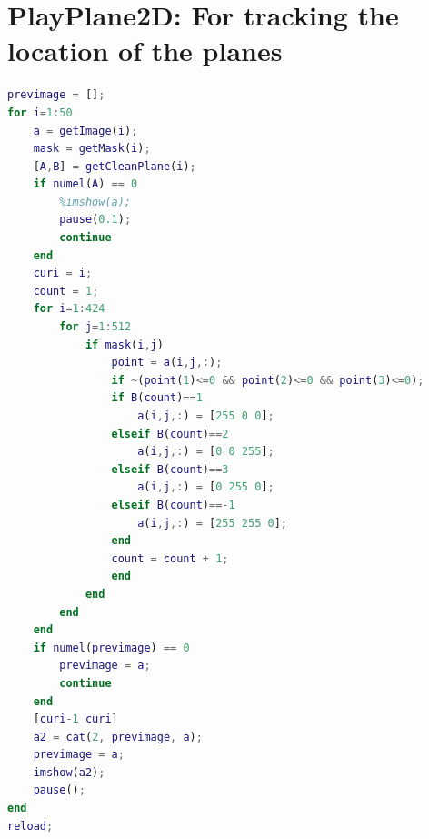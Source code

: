 \documentclass[10pt,a4paper]{article}
\begin{document}
\section{PlayPlane2D: For tracking the location of the planes}
\begin{lstlisting}[language=matlab]
previmage = [];
for i=1:50
    a = getImage(i);
    mask = getMask(i);
    [A,B] = getCleanPlane(i);
    if numel(A) == 0
        %imshow(a);
        pause(0.1);
        continue
    end
    curi = i;
    count = 1;
    for i=1:424
        for j=1:512
            if mask(i,j)
                point = a(i,j,:);
                if ~(point(1)<=0 && point(2)<=0 && point(3)<=0);
                if B(count)==1
                    a(i,j,:) = [255 0 0];
                elseif B(count)==2
                    a(i,j,:) = [0 0 255];
                elseif B(count)==3
                    a(i,j,:) = [0 255 0];
                elseif B(count)==-1
                    a(i,j,:) = [255 255 0];
                end
                count = count + 1;
                end
            end
        end
    end
    if numel(previmage) == 0
        previmage = a;
        continue
    end
    [curi-1 curi]
    a2 = cat(2, previmage, a);
    previmage = a;
    imshow(a2);
    pause();
end
reload;

\end{lstlisting}
\end{document}
